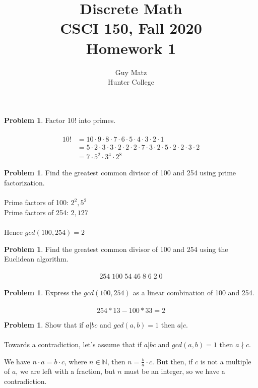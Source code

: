 \documentclass[10pt,leqno ]{article}
\title{Discrete Math\\
CSCI 150, Fall 2020\\
Homework 1}
\author{Guy Matz \\
Hunter College}
\theoremstyle{definition}
\newtheorem{problem}[theorem]{Problem}
\begin{document}
\begin{problem} Factor 10! into primes.
\\\\
\Large
\begin{align*}
10! &= 10 \cdot 9 \cdot 8 \cdot 7  \cdot  6  \cdot  5  \cdot 4 \cdot 3 \cdot 2 \cdot 1\\
    &= 5 \cdot 2 \cdot 3 \cdot 3 \cdot 2 \cdot 2 \cdot 2 \cdot 7 \cdot 3 \cdot 2 \cdot 5 \cdot 2 \cdot 2 \cdot 3 \cdot 2\\
    &= 7 \cdot 5^2 \cdot 3^4 \cdot 2^8
\end{align*}
\end{problem}
\newpage

\begin{problem} Find the greatest common divisor of 100 and 254 using prime factorization.
\\\\
\Large
Prime factors of 100: $2^2, 5^2$\\
Prime factors of 254: $2, 127$\\
\\
Hence $gcd(100, 254) = 2$


\end{problem}
\newpage

\begin{problem} Find  the  greatest  common  divisor  of  100  and  254  using  the  Euclidean algorithm.
\\\\
\Large
$$254 \; 100 \; 54 \; 46 \; 8 \; 6 \; \underline{2} \; 0$$
\end{problem}
\newpage

\begin{problem} Express the $gcd(100,254)$ as a linear combination of 100 and 254.
\\\\
\Large
$$254 * 13 - 100 * 33 = 2$$
\end{problem}
\newpage

\begin{problem} Show that if $a|bc$ and $gcd(a, b) = 1$ then $a|c$.
\\\\
\Large
Towards a contradiction, let's assume that if $a|bc$ and $gcd(a,b) = 1$ then $a \nmid c$.  

We have $n \cdot a = b \cdot c$, where $n \in \mathbb{N}$, 
then $n = \frac{b}{a} \cdot c$.  But then, if $c$ is not a multiple of $a$, 
we are left with a fraction, but $n$ must be an integer, so we have a contradiction.
\end{problem}
\newpage
\end{document}
